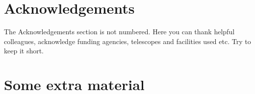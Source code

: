 \documentclass[fleqn,usenatbib]{mnras}
\begin{document}
\section*{Acknowledgements}

The Acknowledgements section is not numbered. Here you can thank helpful
colleagues, acknowledge funding agencies, telescopes and facilities used etc.
Try to keep it short.








\appendix

\section{Some extra material}




\bsp	%
\label{lastpage}
\end{document}
